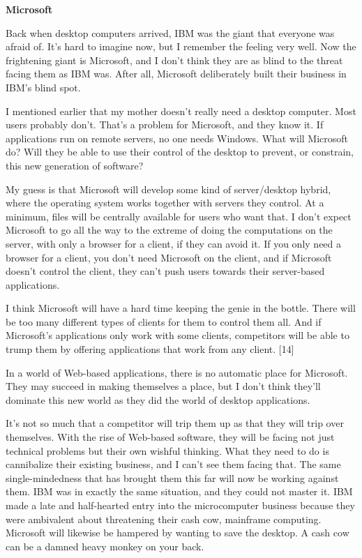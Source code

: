 \textbf{Microsoft}

Back when desktop computers arrived, IBM was the giant that everyone was
afraid of. It's hard to imagine now, but I remember the feeling very
well. Now the frightening giant is Microsoft, and I don't think they are
as blind to the threat facing them as IBM was. After all, Microsoft
deliberately built their business in IBM's blind spot.

I mentioned earlier that my mother doesn't really need a desktop
computer. Most users probably don't. That's a problem for Microsoft, and
they know it. If applications run on remote servers, no one needs
Windows. What will Microsoft do? Will they be able to use their control
of the desktop to prevent, or constrain, this new generation of
software?

My guess is that Microsoft will develop some kind of server/desktop
hybrid, where the operating system works together with servers they
control. At a minimum, files will be centrally available for users who
want that. I don't expect Microsoft to go all the way to the extreme of
doing the computations on the server, with only a browser for a client,
if they can avoid it. If you only need a browser for a client, you don't
need Microsoft on the client, and if Microsoft doesn't control the
client, they can't push users towards their server-based applications.

I think Microsoft will have a hard time keeping the genie in the bottle.
There will be too many different types of clients for them to control
them all. And if Microsoft's applications only work with some clients,
competitors will be able to trump them by offering applications that
work from any client. {[}14{]}

In a world of Web-based applications, there is no automatic place for
Microsoft. They may succeed in making themselves a place, but I don't
think they'll dominate this new world as they did the world of desktop
applications.

It's not so much that a competitor will trip them up as that they will
trip over themselves. With the rise of Web-based software, they will be
facing not just technical problems but their own wishful thinking. What
they need to do is cannibalize their existing business, and I can't see
them facing that. The same single-mindedness that has brought them this
far will now be working against them. IBM was in exactly the same
situation, and they could not master it. IBM made a late and
half-hearted entry into the microcomputer business because they were
ambivalent about threatening their cash cow, mainframe computing.
Microsoft will likewise be hampered by wanting to save the desktop. A
cash cow can be a damned heavy monkey on your back.

